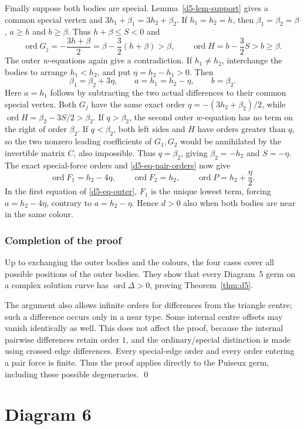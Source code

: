 \documentclass[11pt]{amsart}
\theoremstyle{definition}
\theoremstyle{remark}
\newcommand{\ord}{\operatorname{ord}}
\begin{document}
{Finally suppose both bodies are special.  Lemma~\ref{d5-lem-support} gives a
common special vertex and $3h_1+\beta_1=3h_2+\beta_2$.
If $h_1=h_2=h$, then $\beta_1=\beta_2=\beta$, $a\ge h$ and $b\ge\beta$.
Thus $h+\beta\le S<0$ and
\[
 \ord G_j=-\frac{3h+\beta}{2}
 =\beta-\frac32(h+\beta)>\beta,\qquad
 \ord H=b-\frac32S>b\ge\beta.
\]
The outer $w$-equations again give a contradiction.
If $h_1\ne h_2$, interchange the bodies to arrange $h_1<h_2$, and put
$\eta=h_2-h_1>0$.  Then
\[
 \beta_1=\beta_2+3\eta,\qquad
 a=h_1=h_2-\eta,\qquad b=\beta_2.
\]
Here $a=h_1$ follows by subtracting the two actual differences to their common
special vertex.  Both $G_j$ have the same exact order
$q=-(3h_2+\beta_2)/2$, while $\ord H=\beta_2-3S/2>\beta_2$.
If $q>\beta_2$, the second outer $w$-equation has no term on the right of order
$\beta_2$.  If $q<\beta_2$, both left sides and $H$ have orders greater than
$q$, so the two nonzero leading coefficients of $G_1,G_2$ would be annihilated
by the invertible matrix $C$, also impossible.  Thus $q=\beta_2$, giving
$\beta_2=-h_2$ and $S=-\eta$.
The exact special-force orders and \eqref{d5-eq-pair-orders} now give
\[
 \ord F_1=h_2-4\eta,\qquad
 \ord F_2=h_2,\qquad \ord P=h_2+\frac\eta2.
\]
In the first equation of \eqref{d5-eq-outer}, $F_1$ is the unique lowest term, forcing
$a=h_2-4\eta$, contrary to $a=h_2-\eta$.
Hence $d>0$ also when both bodies are near in the same colour.

\subsubsection{Completion of the proof}
Up to exchanging the outer bodies and the colours, the four cases cover
all possible positions of the outer bodies.  They show that every Diagram~5
germ on a complex solution curve has $\ord\Delta>0$, proving
Theorem~\ref{thm:d5}.

The argument also allows infinite orders for differences from the triangle
centre; such a difference occurs only in a near type.  Some internal centre
offsets may vanish identically as well.  This does not affect the proof,
because the internal pairwise differences retain order $1$, and the
ordinary/special distinction is made using crossed edge differences.
Every special-edge order and every order entering a pair force is finite.
Thus the proof applies directly to the Puiseux germ, including these
possible degeneracies.
\qed
}

\section{Diagram 6}\label{sec:d6}
\end{document}
